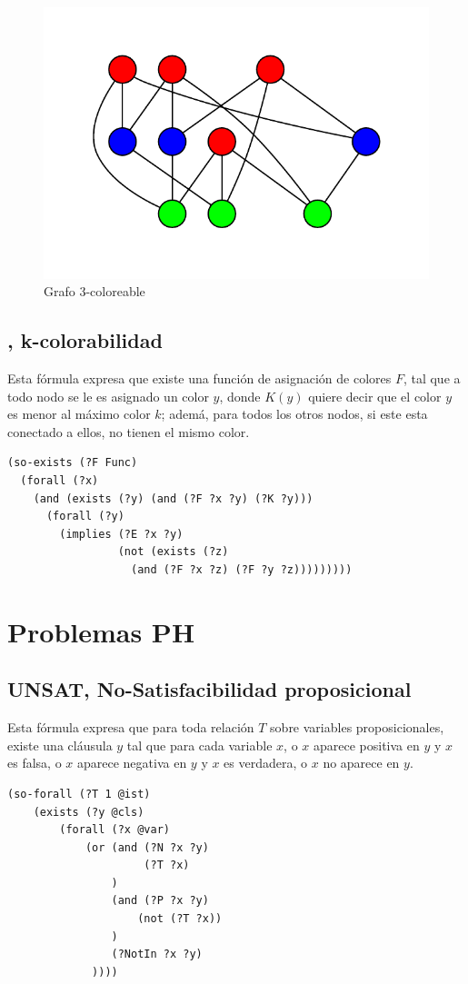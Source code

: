 \begin{figure}[h!]
\centering
\includegraphics[width=\textwidth]{figuras/coloring.pdf}
\caption[Grafo con \textit{3 Colorabilidad}]{Grafo 3-coloreable}
\label{col3}  
\end{figure}

\subsection{\KCOL, k-colorabilidad}
Esta fórmula expresa que existe una función de asignación de colores $F$, tal que a todo nodo se le es
asignado un color $y$, donde $K(y)$ quiere decir que el color $y$ es menor al máximo color
$k$; ademá, para todos los otros nodos, si este esta conectado a ellos, no
tienen el mismo color.

\begin{verbatim}
(so-exists (?F Func)
  (forall (?x) 
    (and (exists (?y) (and (?F ?x ?y) (?K ?y)))
      (forall (?y) 
        (implies (?E ?x ?y)
                 (not (exists (?z)
                   (and (?F ?x ?z) (?F ?y ?z)))))))))
\end{verbatim}

\section{Problemas PH}

\subsection{UNSAT, No-Satisfacibilidad proposicional}
Esta fórmula expresa que para toda relación $T$ sobre variables
proposicionales, existe una cláusula $y$ tal que para cada variable $x$, o $x$
aparece positiva en $y$ y $x$ es falsa, o $x$ aparece negativa en $y$ y $x$ es
verdadera, o $x$ no aparece en $y$.
\begin{verbatim}
(so-forall (?T 1 @ist)
    (exists (?y @cls)
        (forall (?x @var)
            (or (and (?N ?x ?y)
                     (?T ?x)
                )
                (and (?P ?x ?y)
                    (not (?T ?x))
                )
                (?NotIn ?x ?y)
             ))))
\end{verbatim}

